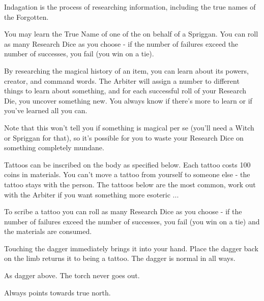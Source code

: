 {Indagation is the process of researching information, including the true names of the Forgotten.



You may learn the True Name of one of the  on behalf of a Spriggan.  You can roll as many Research Dice as you choose - if the number of failures exceed the number of successes, you fail (you win on a tie).


By researching the magical history of an item, you can learn about its powers, creator, and command words.  The Arbiter will assign a number to different things to learn about something, and for each successful roll of your Research Die, you uncover something new. You always know if there's more to learn or if you've learned all you can.

Note that this won't tell you if something is magical per se (you'll need a Witch or Spriggan for that), so it's possible for you to waste your Research Dice on something completely mundane.



Tattoos can be inscribed on the body as specified below.  Each tattoo costs 100 coins in materials. You can't move a tattoo from yourself to someone else - the tattoo stays with the person.  The tattoos below are the most common, work out with the Arbiter if you want something more esoteric ...

To scribe a tattoo you can roll as many Research Dice as you choose - if the number of failures exceed the number of successes, you fail (you win on a tie) and the materials are consumed.




Touching the dagger immediately brings it into your hand.  Place the dagger back on the limb returns it to being a tattoo.  The dagger is normal in all ways.



As dagger above.  The torch never goes out.


Always points towards true north.  


}
